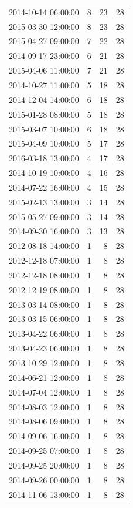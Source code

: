 \begin{tabular}{lrrr}
2014-10-14 06:00:00 & 8 & 23 & 28 \\
2015-03-30 12:00:00 & 8 & 23 & 28 \\
2015-04-27 09:00:00 & 7 & 22 & 28 \\
2014-09-17 23:00:00 & 6 & 21 & 28 \\
2015-04-06 11:00:00 & 7 & 21 & 28 \\
2014-10-27 11:00:00 & 5 & 18 & 28 \\
2014-12-04 14:00:00 & 6 & 18 & 28 \\
2015-01-28 08:00:00 & 5 & 18 & 28 \\
2015-03-07 10:00:00 & 6 & 18 & 28 \\
2015-04-09 10:00:00 & 5 & 17 & 28 \\
2016-03-18 13:00:00 & 4 & 17 & 28 \\
2014-10-19 10:00:00 & 4 & 16 & 28 \\
2014-07-22 16:00:00 & 4 & 15 & 28 \\
2015-02-13 13:00:00 & 3 & 14 & 28 \\
2015-05-27 09:00:00 & 3 & 14 & 28 \\
2014-09-30 16:00:00 & 3 & 13 & 28 \\
2012-08-18 14:00:00 & 1 & 8 & 28 \\
2012-12-18 07:00:00 & 1 & 8 & 28 \\
2012-12-18 08:00:00 & 1 & 8 & 28 \\
2012-12-19 08:00:00 & 1 & 8 & 28 \\
2013-03-14 08:00:00 & 1 & 8 & 28 \\
2013-03-15 06:00:00 & 1 & 8 & 28 \\
2013-04-22 06:00:00 & 1 & 8 & 28 \\
2013-04-23 06:00:00 & 1 & 8 & 28 \\
2013-10-29 12:00:00 & 1 & 8 & 28 \\
2014-06-21 12:00:00 & 1 & 8 & 28 \\
2014-07-04 12:00:00 & 1 & 8 & 28 \\
2014-08-03 12:00:00 & 1 & 8 & 28 \\
2014-08-06 09:00:00 & 1 & 8 & 28 \\
2014-09-06 16:00:00 & 1 & 8 & 28 \\
2014-09-25 07:00:00 & 1 & 8 & 28 \\
2014-09-25 20:00:00 & 1 & 8 & 28 \\
2014-09-26 00:00:00 & 1 & 8 & 28 \\
2014-11-06 13:00:00 & 1 & 8 & 28 \\

\end{tabular}
